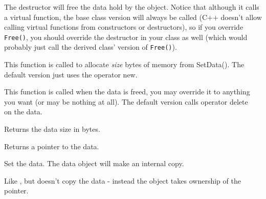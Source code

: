 \label{wxcustomdataobjectdtor}


The destructor will free the data hold by the object. Notice that although it
calls a virtual  function, the base
class version will always be called (C++ doesn't allow calling virtual
functions from constructors or destructors), so if you override {\tt Free()}, you
should override the destructor in your class as well (which would probably
just call the derived class' version of {\tt Free()}).

\label{wxcustomdataobjectalloc}


This function is called to allocate {\it size} bytes of memory from SetData().
The default version just uses the operator new.

\label{wxcustomdataobjectfree}



This function is called when the data is freed, you may override it to anything
you want (or may be nothing at all). The default version calls operator
delete\[\] on the data.

\label{wxcustomdataobjectgetsize}


Returns the data size in bytes.

\label{wxcustomdataobjectgetdata}


Returns a pointer to the data.

\label{wxcustomdataobjectsetdata}


Set the data. The data object will make an internal copy.

\label{wxcustomdataobjecttakedata}


Like , but doesn't copy the data -
instead the object takes ownership of the pointer.
